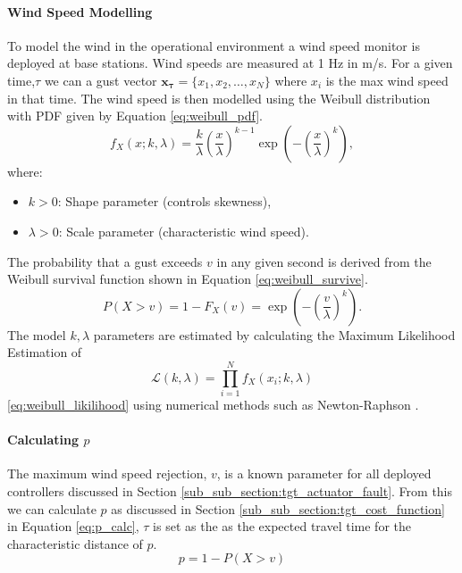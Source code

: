 \paragraph{Wind Speed Modelling}
To model the wind in the operational environment a wind speed monitor is deployed at base stations. Wind speeds are measured at 1 Hz in m/s. For a given time,$\tau$ we can a gust vector $\mathbf{x_{\tau}} =  \{x_1, x_2, \dots, x_N\}$ where $x_i$ is the max wind speed in that time. The wind speed is then modelled using the Weibull distribution \cite{weibull1951} with PDF given by Equation \ref{eq:weibull_pdf}.
\begin{equation}\label{eq:weibull_pdf}
    f_X(x; k, \lambda) = \frac{k}{\lambda} \left(\frac{x}{\lambda}\right)^{k-1} \exp\left(-\left(\frac{x}{\lambda}\right)^k\right),
\end{equation}
where:
\begin{itemize}
    \item \( k > 0 \): Shape parameter (controls skewness),
    \item \( \lambda > 0 \): Scale parameter (characteristic wind speed).
\end{itemize}
The probability that a gust exceeds \( v \) in any given second is derived from the Weibull survival function shown in Equation \ref{eq:weibull_survive}.
\begin{equation}\label{eq:weibull_survive}
    P(X > v) = 1 - F_X(v) = \exp\left(-\left(\frac{v}{\lambda}\right)^k\right).
\end{equation}
The model $k, \lambda$ parameters are estimated by calculating the Maximum Likelihood Estimation of 
\begin{equation}\label{eq:weibull_likilihood}
     \mathcal{L}(k, \lambda) = \prod_{i=1}^N f_X(x_i; k, \lambda)
\end{equation}
\ref{eq:weibull_likilihood} using numerical methods such as Newton-Raphson \cite{rinne2008}.

\paragraph{Calculating $p$}
The maximum wind speed rejection, $v$, is a known parameter for all deployed controllers discussed in Section \ref{sub_sub_section:tgt_actuator_fault}. From this we can calculate $p$ as discussed in Section \ref{sub_sub_section:tgt_cost_function} in Equation \ref{eq:p_calc}, $\tau$ is set as the as the expected travel time for the characteristic distance of $p$.
\begin{equation}\label{eq:p_calc}
    p = 1-P(X>v)
\end{equation}
